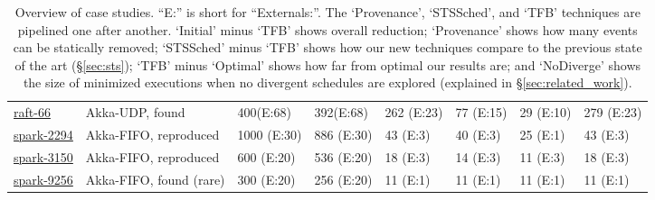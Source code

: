 \begin{table*}
\begin{adjustwidth}{-1.2cm}{}
{\begin{tabular}{|l|l|l|l|l|l||l||l|}
\href{https://docs.google.com/document/d/1lCAR_IE_U27CA-VTlPCi4Kyxf4h6Ykx-0zbkHe0Gfbg}{raft-66}
& Akka-UDP, found
& 400\hfill (E:68) & 392\hfill (E:68) & 262 \hfill (E:23) & 77 \hfill (E:15) &
29 \hfill (E:10) & 279 \hfill (E:23) \\

\href{https://docs.google.com/document/d/1JQiaLlm6XwLCWKOBOFkaMzg8Gd7NT5gDH3_8OV-oekY}{spark-2294}
& Akka-FIFO, reproduced
& 1000 \hfill (E:30) & 886 \hfill (E:30) & 43 \hfill (E:3) & 40 \hfill (E:3) &
25 \hfill (E:1) & 43 \hfill (E:3) \\


\href{https://docs.google.com/document/d/1mWbxS2-B0v4fbY_FIASs6HCmAXFh6K89DMYX-XEmeL8}{spark-3150}
& Akka-FIFO, reproduced
& 600 \hfill (E:20) & 536 \hfill (E:20) & 18 \hfill (E:3) & 14 \hfill (E:3) &
11 \hfill (E:3) & 18 \hfill (E:3) \\

\href{https://docs.google.com/document/d/1rPseAbo3FELT8Fj2lrRUMkrDmjLPYI26Jgr8goAMLzU}{spark-9256}
& Akka-FIFO, found (rare)
& 300 \hfill (E:20) & 256 \hfill (E:20) & 11 \hfill (E:1) & 11 \hfill (E:1) &
11 \hfill (E:1) & 11 \hfill (E:1) \\

\hline
\end{tabular}
\caption{Overview of case studies. ``E:'' is short for ``Externals:''. The
`Provenance', `STSSched', and `TFB' techniques are pipelined one after another.
`Initial' minus `TFB' shows overall reduction; `Provenance' shows how many events can be statically
removed; `STSSched' minus `TFB' shows how our new techniques
compare to the previous state of the art (\S\ref{sec:sts});
 `TFB' minus `Optimal' shows how far from optimal our results are; and
`NoDiverge' shows the size of minimized executions when no divergent schedules are explored (explained
in \S\ref{sec:related_work}).}
\label{dtab:case_studies}
}
\end{adjustwidth}
\end{table*}

